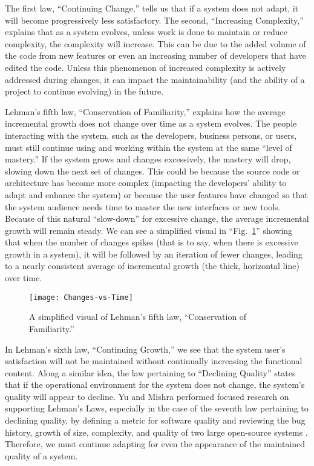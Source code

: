 The first law, ``Continuing Change,'' tells us that if a system does not adapt, it will become progressively less satisfactory. The second, ``Increasing Complexity,'' explains that as a system evolves, unless work is done to maintain or reduce complexity, the complexity will increase. This can be due to the added volume of the code from new features or even an increasing number of developers that have edited the code. Unless this phenomenon of increased complexity is actively addressed during changes, it can impact the maintainability (and the ability of a project to continue evolving) in the future.

Lehman's fifth law, ``Conservation of Familiarity,'' explains how the average incremental growth does not change over time as a system evolves. The people interacting with the system, such as the developers, business persons, or users, must still continue using and working within the system at the same ``level of mastery.'' If the system grows and changes excessively, the mastery will drop, slowing down the next set of changes. This could be because the source code or architecture has become more complex (impacting the developers' ability to adapt and enhance the system) or because the user features have changed so that the system audience needs time to master the new interfaces or new tools. Because of this natural ``slow-down'' for excessive change, the average incremental growth will remain steady. We can see a simplified visual in ``Fig.~\ref{figConservationOfFamiliarity}'' showing that when the number of changes spikes (that is to say, when there is excessive growth in a system), it will be followed by an iteration of fewer changes, leading to a nearly consistent average of incremental growth (the thick, horizontal line) over time.

\begin{figure}[ht]
    \centerline{
        \texttt{[image: Changes-vs-Time]}
    }
    \caption{A simplified visual of Lehman's fifth law, ``Conservation of Familiarity.''}
    \label{figConservationOfFamiliarity}
\end{figure}

In Lehman's sixth law, ``Continuing Growth,'' we see that the system user's satisfaction will not be maintained without continually increasing the functional content. Along a similar idea, the law pertaining to ``Declining Quality'' states that if the operational environment for the system does not change, the system's quality will appear to decline. Yu and Mishra performed focused research on supporting Lehman's Laws, especially in the case of the seventh law pertaining to declining quality, by defining a metric for software quality and reviewing the bug history, growth of size, complexity, and quality of two large open-source systems \cite{yu:2013}. Therefore, we must continue adapting for even the appearance of the maintained quality of a system.

